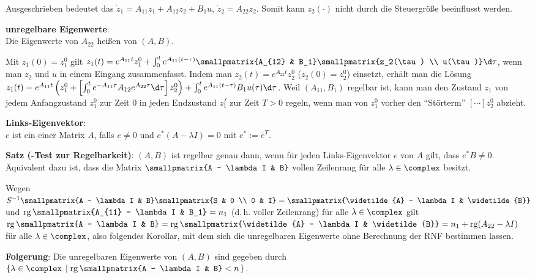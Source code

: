 Ausgeschrieben bedeutet das $\dot{z}_1 = A_{11} z_1 + A_{12} z_2 + B_1 u$,
$\dot{z}_2 = A_{22} z_2$.
Somit kann $z_2(\cdot)$ nicht durch die Steuergröße beeinflusst werden.

\textbf{unregelbare Eigenwerte}:\\
Die Eigenwerte von $A_{22}$ heißen 
von $(A, B)$.

Mit $z_1(0) = z_1^0$ gilt
$z_1(t) = e^{A_{11}t} z_1^0 + \int_0^t e^{A_{11}(t - \tau)} \smallpmatrix{A_{12} & B_1}
\smallpmatrix{z_2(\tau) \\ u(\tau)} \d\tau$,
wenn man $z_2$ und $u$ in einem Eingang zusammenfasst.
Indem man $z_2(t) = e^{A_{22}t} z_2^0$ ($z_2(0) = z_2^0$) einsetzt, erhält man
die Lösung
$z_1(t) = e^{A_{11}t} \left(z_1^0 +
\left[\int_0^t e^{-A_{11}\tau} A_{12} e^{A_{22}\tau} \d\tau\right] z_2^0\right) +
\int_0^t e^{A_{11}(t - \tau)} B_1 u(\tau) \d\tau$.
Weil $(A_{11}, B_1)$ regelbar ist, kann man den Zustand $z_1$ von jedem Anfangzustand
$z_1^0$ zur Zeit $0$ in jeden Endzustand $z_1^f$ zur Zeit $T > 0$ regeln,
wenn man von $z_1^0$ vorher den "`Störterm"' $[\cdots]z_2^0$ abzieht.

\linie

\textbf{Links-Eigenvektor}:\\
$e$ ist ein  einer Matrix $A$, falls
$e \not= 0$ und $e^\ast (A - \lambda I) = 0$ mit $e^\ast := \overline{e}^T$.

\textbf{Satz (-Test zur Regelbarkeit)}:
$(A, B)$ ist regelbar genau dann, wenn für
jeden Links-Eigenvektor $e$ von $A$ gilt, dass $e^\ast B \not= 0$.
Äquivalent dazu ist, dass die Matrix $\smallpmatrix{A - \lambda I & B}$
vollen Zeilenrang für alle $\lambda \in \complex$ besitzt.

Wegen $S^{-1} \smallpmatrix{A - \lambda I & B} \smallpmatrix{S & 0 \\ 0 & I} =
\smallpmatrix{\widetilde{A} - \lambda I & \widetilde{B}}$ und
$\rg\smallpmatrix{A_{11} - \lambda I & B_1} = n_1$
(d.\,h. voller Zeilenrang) für alle $\lambda \in \complex$ gilt
$\rg\smallpmatrix{A - \lambda I & B}
= \rg\smallpmatrix{\widetilde{A} - \lambda I & \widetilde{B}}
= n_1 + \rg(A_{22} - \lambda I)$
für alle $\lambda \in \complex$,
also folgendes Korollar,
mit dem sich die unregelbaren Eigenwerte ohne Berechnung der RNF bestimmen lassen.

\textbf{Folgerung}:
Die unregelbaren Eigenwerte von $(A, B)$ sind gegeben durch\\
$\left\{\lambda \in \complex \;\left|\; \rg\smallpmatrix{A - \lambda I & B} < n\right.\right\}$.

